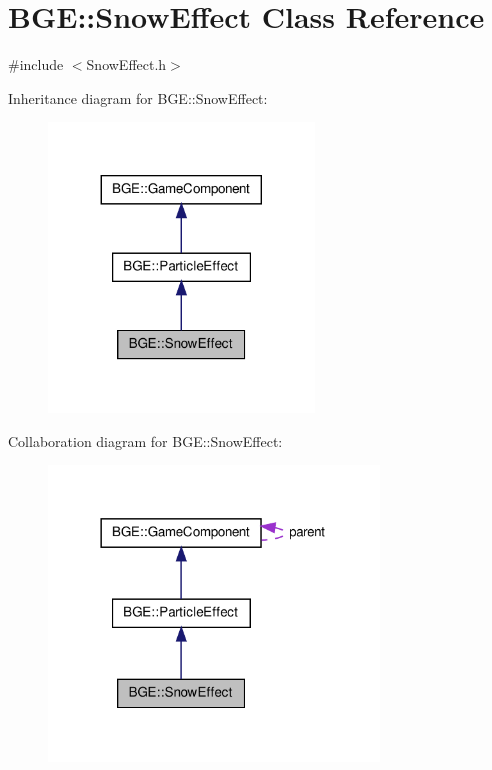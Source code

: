 \hypertarget{class_b_g_e_1_1_snow_effect}{\section{B\-G\-E\-:\-:Snow\-Effect Class Reference}
\label{class_b_g_e_1_1_snow_effect}
}


{\ttfamily \#include $<$Snow\-Effect.\-h$>$}



Inheritance diagram for B\-G\-E\-:\-:Snow\-Effect\-:
\nopagebreak
\begin{figure}[H]
\begin{center}
\leavevmode
\includegraphics[width=200pt]{class_b_g_e_1_1_snow_effect__inherit__graph}
\end{center}
\end{figure}


Collaboration diagram for B\-G\-E\-:\-:Snow\-Effect\-:
\nopagebreak
\begin{figure}[H]
\begin{center}
\leavevmode
\includegraphics[width=249pt]{class_b_g_e_1_1_snow_effect__coll__graph}
\end{center}
\end{figure}
